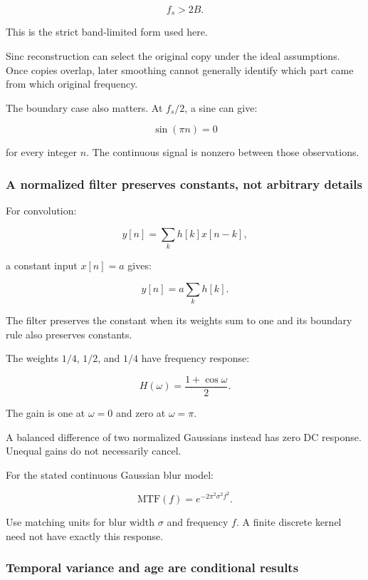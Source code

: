 \[
f_s>2B.
\]

This is the strict band-limited form used here.

Sinc reconstruction can select the original copy under the ideal assumptions. Once copies overlap, later smoothing cannot generally identify which part came from which original frequency.

The boundary case also matters. At \(f_s/2\), a sine can give:

\[
\sin(\pi n)=0
\]

for every integer \(n\). The continuous signal is nonzero between those observations.

\subsubsection{A normalized filter preserves constants, not arbitrary details}\label{04-visual-computing-ii-ch042-a-normalized-filter-preserves-constants-not-arbitrary-details}

\hypertarget{04-visual-computing-ii-ch042-a-normalized-filter-preserves-constants-not-arbitrary-details}{}

For convolution:

\[
y[n]=\sum_k h[k]x[n-k],
\]

a constant input \(x[n]=a\) gives:

\[
y[n]=a\sum_k h[k].
\]

The filter preserves the constant when its weights sum to one and its boundary rule also preserves constants.

The weights \(1/4\), \(1/2\), and \(1/4\) have frequency response:

\[
H(\omega)=\frac{1+\cos\omega}{2}.
\]

The gain is one at \(\omega=0\) and zero at \(\omega=\pi\).

A balanced difference of two normalized Gaussians instead has zero DC response. Unequal gains do not necessarily cancel.

For the stated continuous Gaussian blur model:

\[
\mathrm{MTF}(f)=e^{-2\pi^2\sigma^2f^2}.
\]

Use matching units for blur width \(\sigma\) and frequency \(f\). A finite discrete kernel need not have exactly this response.

\subsubsection{Temporal variance and age are conditional results}\label{04-visual-computing-ii-ch042-temporal-variance-and-age-are-conditional-results}

